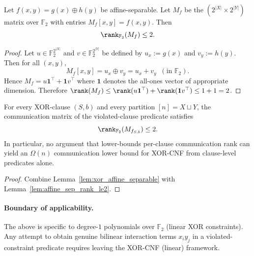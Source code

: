 \begin{lemma}\label{lem:affine_sep_rank_le2}
Let $f(x,y)=g(x)\oplus h(y)$ be affine-separable. Let $M_f$ be the $(2^{|X|}\times 2^{|Y|})$ matrix over $\mathbb{F}_2$ with entries
$M_f[x,y]=f(x,y)$.
Then
\[
\rank_{\mathbb{F}_2}(M_f)\le 2.
\]
\end{lemma}

\begin{proof}
Let $u\in\mathbb{F}_2^{2^{|X|}}$ and $v\in\mathbb{F}_2^{2^{|Y|}}$ be defined by $u_x:=g(x)$ and $v_y:=h(y)$.
Then for all $(x,y)$,
\[
M_f[x,y]=u_x\oplus v_y = u_x + v_y \;\;(\text{in }\mathbb{F}_2).
\]
Hence $M_f = u\mathbf{1}^\top + \mathbf{1}v^\top$ where $\mathbf{1}$ denotes the all-ones vector of appropriate dimension.
Therefore $\rank(M_f)\le \rank(u\mathbf{1}^\top)+\rank(\mathbf{1}v^\top)\le 1+1=2$.
\end{proof}

\begin{corollary}\label{cor:xor_clause_rank_constant}
For every XOR-clause $(S,b)$ and every partition $[n]=X\sqcup Y$, the communication matrix of the violated-clause predicate satisfies
\[
\rank_{\mathbb{F}_2}(M_{f_{S,b}})\le 2.
\]
In particular, no argument that lower-bounds per-clause communication rank can yield an $\Omega(n)$ communication lower bound for XOR-CNF from clause-level predicates alone.
\end{corollary}

\begin{proof}
Combine Lemma~\ref{lem:xor_affine_separable} with Lemma~\ref{lem:affine_sep_rank_le2}.
\end{proof}

\paragraph{Boundary of applicability.}
The above is specific to degree-$1$ polynomials over $\mathbb{F}_2$ (linear XOR constraints). Any attempt to obtain genuine bilinear interaction terms $x_i y_j$ in a violated-constraint predicate requires leaving the XOR-CNF (linear) framework.
